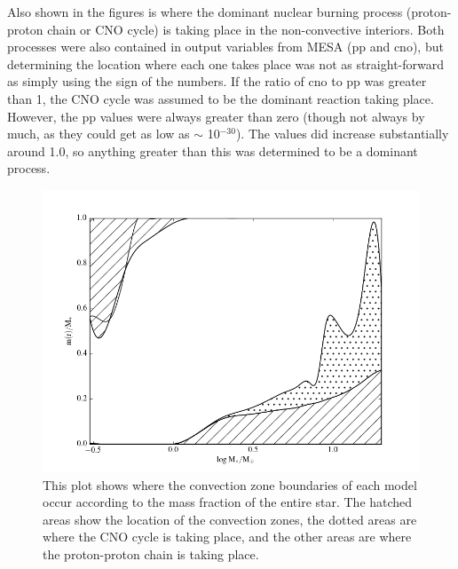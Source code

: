 \documentclass[12pt]{article}
\begin{document}
\noindent
Also shown in the figures is
where the dominant nuclear burning process (proton-proton chain or CNO cycle)
is taking place in the non-convective interiors. Both processes were also
contained in output variables from MESA (pp and cno), but determining the location
where each one takes place was not as straight-forward as simply using the sign
of the numbers. If the ratio of cno to pp was greater than 1, the CNO cycle
was assumed to be the dominant reaction taking place. However, the pp values
were always greater than zero (though not always by much, as they could get
as low as $\sim$ 10$^{-30}$). The values did increase substantially around
1.0, so anything greater than this was determined to be a dominant process.
\newpage
\begin{figure}
  \centering
  \includegraphics[width=7.0in]{money.png}
  \caption{This plot shows where the convection zone boundaries of
  each model occur according to the mass fraction of the entire star.
  The hatched areas show the location of the convection zones,
  the dotted areas are where the CNO cycle is taking place, and the
  other areas are where the proton-proton chain is taking place.}
  \label{money}
\end{figure}
\newpage
\end{document}
